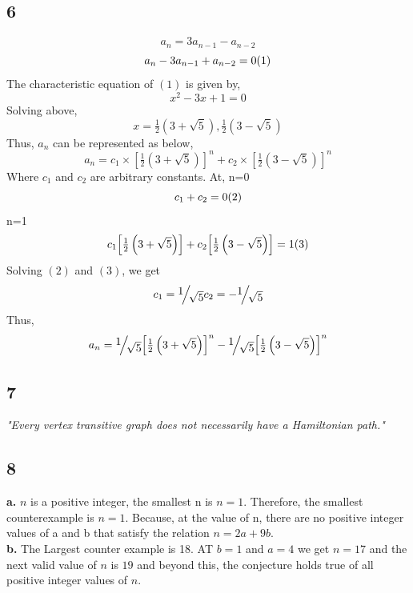 \documentclass[10pt, twocolumn]{article}
\begin{document}
\subsection*{6}
\[{a_{n}} = 3{a_{n - 1}} - {a_{n - 2}}\]
\[{a_{n}} - 3{a_{n - 1}} + {a_{n - 2}} = 0\hfill(1)\]
The characteristic equation of $(1)$ is given by,
\[{x^2} - 3x + 1 = 0\]
Solving above,
\[x = \tfrac{1}{2}\left( {3 + \sqrt 5 } \right),\tfrac{1}{2}\left( {3 - \sqrt 5 } \right)\]
Thus, $a_n$ can be represented as below,
\[{a_n} = {c_1} \times {\left[ {\tfrac{1}{2}\left( {3 + \sqrt 5 } \right)} \right]^n} + {c_2} \times {\left[ {\tfrac{1}{2}\left( {3 - \sqrt 5 } \right)} \right]^n}\]
Where $c_1$ and $c_2$ are arbitrary constants. At, n=0
\[c_1+c_2=0\hfill(2)\]
n=1
\[{c_1}  {\left[ {\tfrac{1}{2}\left( {3 + \sqrt 5 } \right)} \right]} + {c_2}  {\left[ {\tfrac{1}{2}\left( {3 - \sqrt 5 } \right)} \right]}=1\hfill(3)\]
Solving $(2)$ and $(3)$, we get
\[{c_1} = {\raise0.7ex\hbox{$1$} \!\mathord{\left/
 {\vphantom {1 {\sqrt 5 }}}\right.\kern-\nulldelimiterspace}
\!\lower0.7ex\hbox{${\sqrt 5 }$}}\\
{c_2} =  - {\raise0.7ex\hbox{$1$} \!\mathord{\left/
 {\vphantom {1 {\sqrt 5 }}}\right.\kern-\nulldelimiterspace}
\!\lower0.7ex\hbox{${\sqrt 5 }$}}\]
Thus,
\[{a_n} = {\raise0.7ex\hbox{$1$} \!\mathord{\left/
 {\vphantom {1 {\sqrt 5 }}}\right.\kern-\nulldelimiterspace}
\!\lower0.7ex\hbox{${\sqrt 5 }$}}{\left[ {\tfrac{1}{2}\left( {3 + \sqrt 5 } \right)} \right]^n} - {\raise0.7ex\hbox{$1$} \!\mathord{\left/
 {\vphantom {1 {\sqrt 5 }}}\right.\kern-\nulldelimiterspace}
\!\lower0.7ex\hbox{${\sqrt 5 }$}}{\left[ {\tfrac{1}{2}\left( {3 - \sqrt 5 } \right)} \right]^n}\]
\subsection*{7}
\textit{"Every vertex transitive graph does not necessarily have a Hamiltonian path."}
\subsection*{8}
\textbf{a. } $n$ is a positive integer, the smallest n is $n=1$. Therefore, the smallest counterexample is $n=1$. Because, at the value of n, there are no positive integer values of a and b that satisfy the relation $n=2a+9b$.\\

\textbf{b. } The Largest counter example is 18. AT $b=1$ and $a=4$ we get $n=17$ and the next valid value of $n$ is $19$ and beyond this, the conjecture holds true of all positive integer values of $n$.\\
\end{document}
